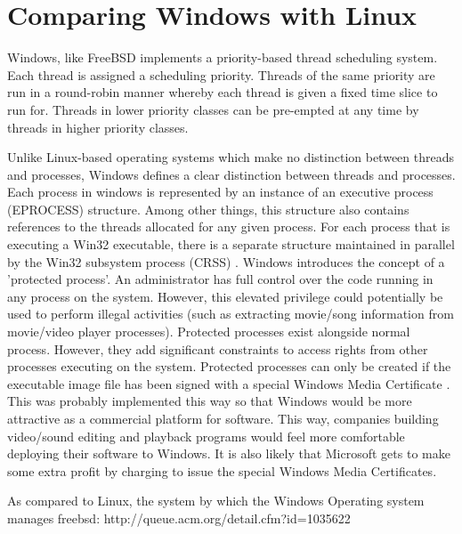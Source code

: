 \section{Comparing Windows with Linux}
Windows, like FreeBSD implements a priority-based thread scheduling system.  Each thread is assigned a scheduling priority.  Threads of the same priority are run in a round-robin manner whereby each thread is given a fixed time slice to run for.  Threads in lower priority classes can be pre-empted at any time by threads in higher priority classes.

Unlike Linux-based operating systems which make no distinction between threads and processes, Windows defines a clear distinction between threads and processes.  Each process in windows is represented by an instance of an executive process (EPROCESS) structure.  Among other things, this structure also contains references to the threads allocated for any given process.  For each process that is executing a Win32 executable, there is a separate structure maintained in parallel by the Win32 subsystem process (CRSS) \cite{windows}.
	Windows introduces the concept of a 'protected process'.  An administrator has full control over the code running in any process on the system.  However, this elevated privilege could potentially be used to perform illegal activities (such as extracting movie/song information from movie/video player processes).  Protected processes exist alongside normal process.  However, they add significant constraints to access rights from other processes executing on the system.  Protected processes can only be created if the executable image file has been signed with a special Windows Media Certificate \cite{windows}.  This was probably implemented this way so that Windows would be more attractive as a commercial platform for software.  This way, companies building video/sound editing and playback programs would feel more comfortable deploying their software to Windows.  It is also likely that Microsoft gets to make some extra profit by charging to issue the special Windows Media Certificates.

As compared to Linux, the system by which the Windows Operating system manages 
freebsd:
	http://queue.acm.org/detail.cfm?id=1035622
